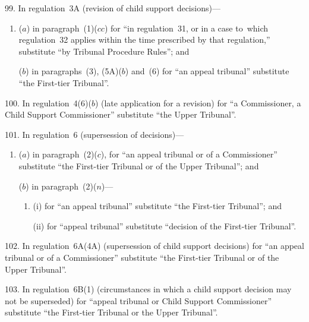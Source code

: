 \documentclass[12pt,a4paper]{article}
\begin{document}
\medskip

99.  In regulation~3A (revision of child support decisions)—
\begin{enumerate}\item[]
($a$) in paragraph~(1)($cc$)  for “in regulation~31, or in a case to~which regulation~32 applies within the time prescribed by that regulation,” substitute “by Tribunal Procedure Rules”; and

($b$) in paragraphs~(3), (5A)($b$)  and~(6) for “an appeal tribunal” substitute “the First-tier Tribunal”.
\end{enumerate}

\medskip

100.  In regulation~4(6)($b$)  (late application for a revision) for “a Commissioner, a Child Support Commissioner” substitute “the Upper Tribunal”.

\medskip

101.  In regulation~6 (supersession of decisions)—
\begin{enumerate}\item[]
($a$) in paragraph~(2)($c$), for “an appeal tribunal or of a Commissioner” substitute “the First-tier Tribunal or of the Upper Tribunal”; and

($b$) in paragraph~(2)($n$)—
\begin{enumerate}\item[]
(i) for “an appeal tribunal” substitute “the First-tier Tribunal”; and

(ii) for “appeal tribunal” substitute “decision of the First-tier Tribunal”.
\end{enumerate}
\end{enumerate}

\medskip

102.  In regulation~6A(4A) (supersession of child support decisions) for “an appeal tribunal or of a Commissioner” substitute “the First-tier Tribunal or of the Upper Tribunal”.

\medskip

103.  In regulation~6B(1) (circumstances in which a child support decision may not be superseded) for “appeal tribunal or Child Support Commissioner” substitute “the First-tier Tribunal or the Upper Tribunal”.

\medskip
\end{document}
